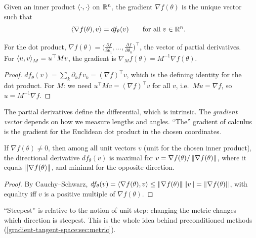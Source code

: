 \begin{notechapter}
\begin{definition}
Given an inner product $\left\langle \cdot, \cdot \right\rangle$ on $\mathbb{R}^n$, the gradient $\nabla f(\theta)$ is the unique vector
such that
\[
  \left\langle \nabla f(\theta), v \right\rangle = df_\theta(v)\qquad\text{for all }v\in\mathbb{R}^n .
\]
\end{definition}

\begin{proposition}\label{gradient-tangent-space:prop:metric}
For the dot product, $\nabla f(\theta) = \bigl(\frac{\partial f}{\partial\theta_1},\dots,\frac{\partial f}{\partial\theta_n}\bigr)^\top$, the vector of
partial derivatives. For $\left\langle u, v \right\rangle_M = u^\top Mv$, the gradient is $\nabla_Mf(\theta) = M^{-1}\nabla f(\theta)$.
\end{proposition}

\begin{proof}
$df_\theta(v) = \sum_k\partial_kf\,v_k = (\nabla f)^\top v$, which is the defining identity for the dot
product. For $M$: we need $u^\top Mv = (\nabla f)^\top v$ for all $v$, i.e.\ $Mu = \nabla f$, so $u = M^{-1}\nabla f$.
\end{proof}

\begin{keyidea}
The partial derivatives define the differential, which is intrinsic. The \emph{gradient vector}
depends on how we measure lengths and angles. ``The'' gradient of calculus is the gradient for
the Euclidean dot product in the chosen coordinates.
\end{keyidea}

\begin{theorem}\label{gradient-tangent-space:thm:steepest}
If $\nabla f(\theta)\neq0$, then among all unit vectors $v$ (unit for the chosen inner product), the
directional derivative $df_\theta(v)$ is maximal for $v = \nabla f(\theta)/\left\|\nabla f(\theta)\right\|$, where it equals
$\left\|\nabla f(\theta)\right\|$, and minimal for the opposite direction.
\end{theorem}

\begin{proof}
By Cauchy--Schwarz, $df_\theta(v) = \left\langle \nabla f(\theta), v \right\rangle\leq\left\|\nabla f(\theta)\right\|\left\|v\right\| = \left\|\nabla f(\theta)\right\|$, with equality iff $v$ is a
positive multiple of $\nabla f(\theta)$.
\end{proof}

``Steepest'' is relative to the notion of unit step: changing the metric changes which direction
is steepest. This is the whole idea behind preconditioned methods
(\cref{gradient-tangent-space:sec:metric}).


\end{notechapter}
